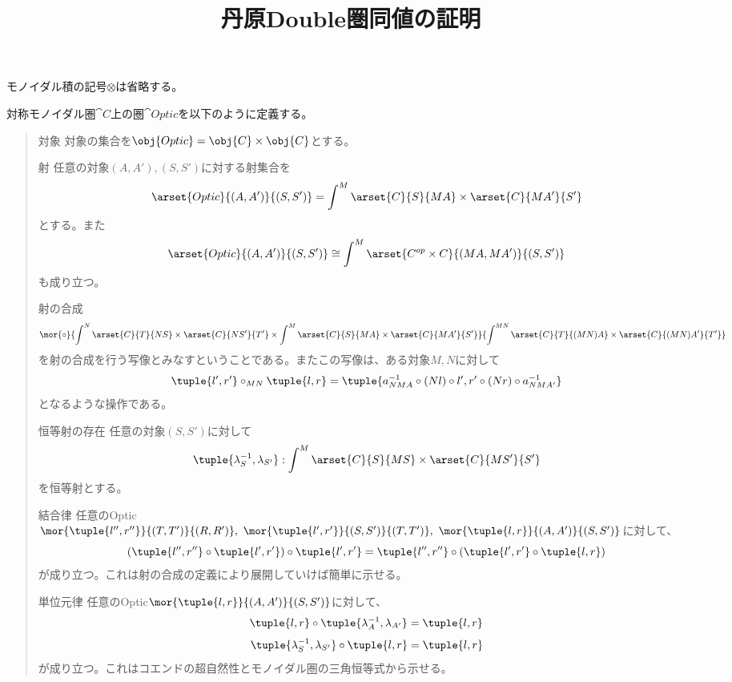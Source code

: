 \documentclass[uplatex,dvipdfmx]{jsarticle}
\begin{document}
  \title{丹原Double圏同値の証明}
  \maketitle
  モノイダル積の記号$\otimes$は省略する。
  \begin{define}[Opticsの圏]\label{def-cat-of-optics}
    対称モノイダル圏$\cat{C}$上の圏$\cat{Optic}$を以下のように定義する。
    \begin{quote}
			\begin{mydescription}
				\item[対象] 対象の集合を$\obj{Optic}=\obj{C}\times \obj{C}$とする。
				\item[射] 任意の対象$(A,A'), (S,S')$に対する射集合を\[\arset{Optic}{(A,A')}{(S,S')}=\int^{M}\arset{C}{S}{MA}\times\arset{C}{MA'}{S'}\]とする。また\[\arset{Optic}{(A,A')}{(S,S')}\cong\int^M\arset{C^{op}\times C}{(MA,MA')}{(S,S')}\]も成り立つ。
				\item[射の合成] {\[\mor{\circ}{\int^{N} \arset{C}{T}{NS}\times\arset{C}{NS'}{T'}\times \int^{M}\arset{C}{S}{MA}\times \arset{C}{MA'}{S'}}{\int^{MN}\arset{C}{T}{(MN)A}\times \arset{C}{(MN)A'}{T'}}\]}を射の合成を行う写像とみなすということである。またこの写像は、ある対象$M,N$に対して
        \[\tuple{l',r'}\circ_{MN}\tuple{l,r}=\tuple{a_{NMA}^{-1}\circ(Nl)\circ l',r'\circ(Nr)\circ a_{NMA'}^{-1}}\]
        となるような操作である。
				\item[恒等射の存在] 任意の対象$(S,S')$に対して\[\tuple{\lambda_S^{-1},\lambda_{S'}}:\int^{M}\arset{C}{S}{MS}\times \arset{C}{MS'}{S'}\]を恒等射とする。
				\item[結合律]任意のOptic$\mor{\tuple{l'',r''}}{(T,T')}{(R,R')},\ \mor{\tuple{l',r'}}{(S,S')}{(T,T')},\ \mor{\tuple{l,r}}{(A,A')}{(S,S')}$に対して、
        \[(\tuple{l'',r''}\circ\tuple{l',r'})\circ\tuple{l',r'}=\tuple{l'',r''}\circ(\tuple{l',r'}\circ\tuple{l,r})\]が成り立つ。これは射の合成の定義により展開していけば簡単に示せる。
				\item[単位元律]任意のOptic$\mor{\tuple{l,r}}{(A,A')}{(S,S')}$に対して、
        \[\tuple{l,r}\circ\tuple{\lambda_A^{-1},\lambda_{A'}}=\tuple{l,r}\]
        \[\tuple{\lambda_S^{-1},\lambda_{S'}}\circ\tuple{l,r}=\tuple{l,r}\]
        が成り立つ。これはコエンドの超自然性とモノイダル圏の三角恒等式から示せる。
			\end{mydescription}
		\end{quote}
  \end{define}
\end{document}
